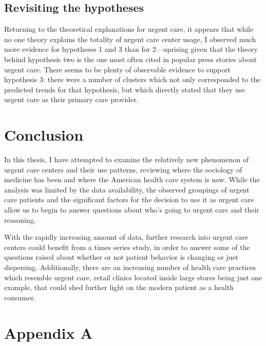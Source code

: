 \documentclass[12pt,twoside]{reedthesis}
\begin{document}
  \section*{Revisiting the hypotheses}\label{revisiting-the-hypotheses}
  
  \doublespacing
  Returning to the theoretical explanations for urgent care, it appears
  that while no one theory explains the totality of urgent care center
  usage, I observed much more evidence for hypotheses 1 and 3 than for
  2---uprising given that the theory behind hypothesis two is the one most
  often cited in popular press stories about urgent care. There seems to
  be plenty of observable evidence to support hypothesis 3: there were a
  number of clusters which not only corresponded to the predicted trends
  for that hypothesis, but which directly stated that they use urgent care
  as their primary care provider.
  
  \chapter*{Conclusion}\label{conclusion}
  
  \setcounter{chapter}{6} \setcounter{section}{0} \doublespacing
  
  In this thesis, I have attempted to examine the relatively new
  phenomenon of urgent care centers and their use patterns, reviewing
  where the sociology of medicine has been and where the American health
  care system is now. While the analysis was limited by the data
  availability, the observed groupings of urgent care patients and the
  significant factors for the decision to use it as urgent care allow us
  to begin to answer questions about who's going to urgent care and their
  reasoning.
  
  With the rapidly increasing amount of data, further research into urgent
  care centers could benefit from a times series study, in order to answer
  some of the questions raised about whether or not patient behavior is
  changing or just dispersing. Additionally, there are an increasing
  number of health care practices which resemble urgent care, retail
  clinics located inside large stores being just one example, that could
  shed further light on the modern patient as a health consumer.
  
  \chapter*{Appendix A}\label{appendix-a}
  
\end{document}
